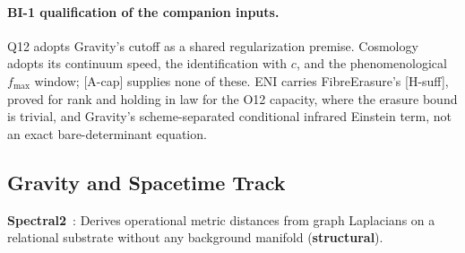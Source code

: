 \documentclass[11pt,a4paper]{article}
\newcommand{\sstruct}{\textcolor{cstruct}{\textbf{structural}}}
\begin{document}
  \paragraph{BI-1 qualification of the companion inputs.}
    Q12 adopts Gravity's cutoff as a shared regularization premise.
    Cosmology adopts its continuum speed, the identification with $c$, and the phenomenological
    $f_{\max}$ window; [A-cap] supplies none of these.
    ENI carries FibreErasure's [H-suff], proved for rank and holding in law for the O12 capacity, where
    the erasure bound is trivial,
    and Gravity's scheme-separated conditional infrared Einstein term, not an exact bare-determinant equation.

  \subsection{Gravity and Spacetime Track}

    \textbf{Spectral2}~\cite{Beau2026a}: Derives operational metric distances from graph Laplacians
    on a relational substrate without any background manifold (\sstruct).
\end{document}
